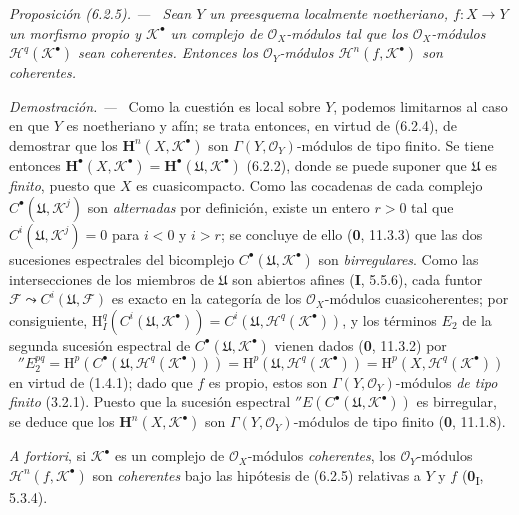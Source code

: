 \documentclass[10pt,oneside]{book}
\newenvironment{proposition}[1][]{\par\medskip\noindent\itshape Proposición (#1). ---\ }{\par}
\newenvironment{proof}{\par\medskip\noindent\textit{Demostración. ---\ }}{\par}
\begin{document}
\begin{proposition}[6.2.5]
Sean $Y$ un preesquema localmente noetheriano, $f:X\to Y$ un morfismo propio
y $\mathscr K^\bullet$ un complejo de $\mathscr O_X$-módulos tal que los
$\mathscr O_X$-módulos $\mathscr H^q(\mathscr K^\bullet)$ sean coherentes.
Entonces los $\mathscr O_Y$-módulos $\mathscr H^n(f,\mathscr K^\bullet)$ son
coherentes.
\end{proposition}

\begin{proof}
Como la cuestión es local sobre $Y$, podemos limitarnos al caso en que $Y$ es
noetheriano y afín; se trata entonces, en virtud de (6.2.4), de demostrar que
los $\mathbf H^n(X,\mathscr K^\bullet)$ son
$\Gamma(Y,\mathscr O_Y)$-módulos de tipo finito. Se tiene entonces
$\mathbf H^\bullet(X,\mathscr K^\bullet)=
\mathbf H^\bullet(\mathfrak U,\mathscr K^\bullet)$ (6.2.2), donde se puede
suponer que $\mathfrak U$ es \emph{finito}, puesto que $X$ es cuasicompacto. Como las
cocadenas de cada complejo $C^\bullet(\mathfrak U,\mathscr K^j)$ son
\emph{alternadas} por definición, existe un entero $r>0$ tal que
$C^i(\mathfrak U,\mathscr K^j)=0$ para $i<0$ y $i>r$; se concluye de ello
(\textbf 0, 11.3.3) que las dos sucesiones espectrales del bicomplejo
$C^\bullet(\mathfrak U,\mathscr K^\bullet)$ son \emph{birregulares}. Como las
intersecciones de los miembros de $\mathfrak U$ son abiertos afines
(\textbf I, 5.5.6), cada funtor
$\mathscr F\leadsto C^i(\mathfrak U,\mathscr F)$ es exacto en la categoría de
los $\mathscr O_X$-módulos cuasicoherentes; por consiguiente,
$\mathrm H_I^q(C^i(\mathfrak U,\mathscr K^\bullet))
=C^i(\mathfrak U,\mathscr H^q(\mathscr K^\bullet))$, y los términos
$E_2$ de la segunda sucesión espectral de
$C^\bullet(\mathfrak U,\mathscr K^\bullet)$ vienen dados (\textbf 0, 11.3.2) por
\[
  ''E_2^{pq}
  =\mathrm H^p(C^\bullet(\mathfrak U,\mathscr H^q(\mathscr K^\bullet)))
  =\mathrm H^p(\mathfrak U,\mathscr H^q(\mathscr K^\bullet))
  =\mathrm H^p(X,\mathscr H^q(\mathscr K^\bullet))
\]
en virtud de (1.4.1); dado que $f$ es propio, estos son
$\Gamma(Y,\mathscr O_Y)$-módulos \emph{de tipo finito} (3.2.1). Puesto que la sucesión
espectral $''E(C^\bullet(\mathfrak U,\mathscr K^\bullet))$ es birregular, se
deduce que los $\mathbf H^n(X,\mathscr K^\bullet)$ son
$\Gamma(Y,\mathscr O_Y)$-módulos de tipo finito (\textbf 0, 11.1.8).

\emph{A fortiori}, si $\mathscr K^\bullet$ es un complejo de
$\mathscr O_X$-módulos \emph{coherentes}, los $\mathscr O_Y$-módulos
$\mathscr H^n(f,\mathscr K^\bullet)$ son \emph{coherentes} bajo las hipótesis de
(6.2.5) relativas a $Y$ y $f$ (\textbf{0}\textsubscript{I}, 5.3.4).
\end{proof}
\end{document}
